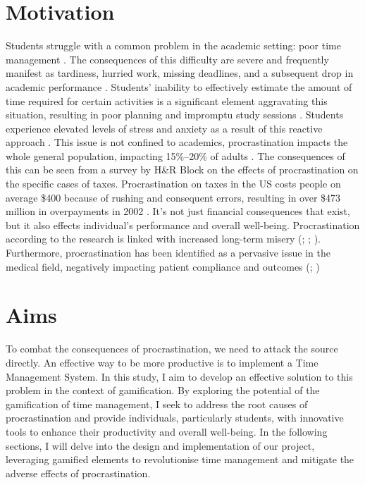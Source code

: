 \documentclass{l4proj}
\begin{document}
\section{Motivation}
Students struggle with a common problem in the academic setting: poor time management \cite{ferrari1995procrastination} \cite{bakar2016relationships}. The consequences of this difficulty are severe and frequently manifest as tardiness, hurried work, missing deadlines, and a subsequent drop in academic performance \cite{article}. Students' inability to effectively estimate the amount of time required for certain activities is a significant element aggravating this situation, resulting in poor planning and impromptu study sessions \cite{buehler2002inside}. Students experience elevated levels of stress and anxiety as a result of this reactive approach \cite{macan1990college}. This issue is not confined to academics, procrastination impacts the whole general population, impacting 15\%–20\% of adults \cite{article2}. The consequences of this can be seen from a survey by H\&R Block on the effects of procrastination on the specific cases of taxes. Procrastination on taxes in the US costs people on average \$400 because of rushing and consequent errors, resulting in over \$473 million in overpayments in 2002 \cite{kasper2004tax}.
It's not just financial consequences that exist, but it also effects individual's performance and overall well-being. Procrastination according to the research is linked with increased long-term misery (\cite{knaus1973overcoming}; \cite{lay1993trait}; \cite{tice1997longitudinal}). Furthermore, procrastination has been identified as a pervasive issue in the medical field, negatively impacting patient compliance and outcomes (\cite{morris1990community}; \cite{white1994conflict})
\\
\section{Aims}
To combat the consequences of procrastination, we need to attack the source directly. An effective way to be more productive is to implement a Time Management System. In this study, I aim to develop an effective solution to this problem in the context of gamification. By exploring the potential of the gamification of time management, I seek to address the root causes of procrastination and provide individuals, particularly students, with innovative tools to enhance their productivity and overall well-being. In the following sections, I will delve into the design and implementation of our project, leveraging gamified elements to revolutionise time management and mitigate the adverse effects of procrastination.
\\
\end{document}
